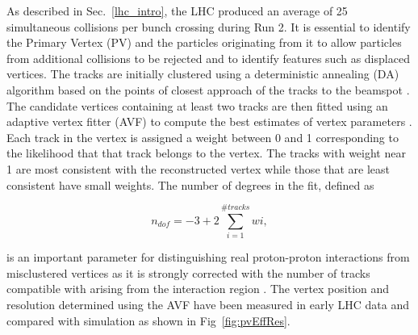 As described in Sec.~\ref{lhc_intro}, the LHC produced an average of 25 simultaneous collisions per bunch crossing
during Run 2. It is essential to identify the Primary Vertex (PV) and the particles originating from it to allow 
particles from additional collisions to be rejected and to identify features such as displaced vertices. The tracks
are initially clustered using a deterministic annealing (DA) algorithm based on the points of closest approach of the 
tracks to the beamspot \cite{tracker_vertex}. The candidate vertices containing at least two tracks are then
fitted using an adaptive vertex fitter (AVF) to compute the best estimates of vertex parameters \cite{tracker_avf}. 
Each track in the vertex is assigned a weight between 0 and 1 corresponding to the likelihood that that track
belongs to the vertex. The tracks with weight near 1 are most consistent with the reconstructed vertex while
those that are least consistent have small weights. The number of degrees in the fit, defined as 

\begin{equation}
n_{dof} = -3 + 2 \sum_{i=1}^{\#tracks} wi,
\end{equation}

is an important parameter for distinguishing real proton-proton interactions from misclustered vertices as it is strongly corrected with
the number of tracks compatible with arising from the interaction region \cite{tracker_vertex}. The vertex
position and resolution determined using the AVF have been 
measured in early LHC data and compared with simulation as shown in Fig~\ref{fig:pvEffRes}.

